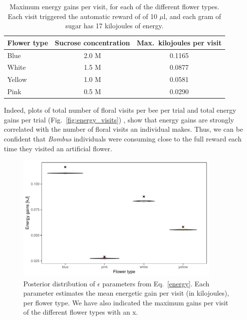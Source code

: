 \begin{refsection}
 \begin{table}[H]
 \centering
 \caption[Maximum energy gains per visit]{Maximum energy gains per visit, for each of the different flower types. Each visit triggered the automatic reward of of  10 $\mu$l, and each gram of sugar has 17 kilojoules of energy.}
 \label{tab:energy}
 \begin{tabular}{lcc}
 \toprule
 Flower type & Sucrose concentration & Max.\ kilojoules per visit \\ \midrule
 Blue        & 2.0 M                   & 0.1165                   \\
 White       & 1.5 M                 & 0.0877                   \\
 Yellow      & 1.0 M                   & 0.0581                   \\
 Pink        & 0.5 M                 & 0.0290                   \\ \bottomrule
 \end{tabular}
 \end{table}

 Indeed, plots of total number of floral visits per bee per trial and total energy gains per trial (Fig.~\ref{fig:energy_visits}) , show that energy gains are strongly correlated with the number of floral visits an individual makes. Thus, we can be confident that \textit{Bombus} individuals were consuming close to the full reward each time they visited an artificial flower.


 \begin{figure}[H]
     \centerline{\includegraphics[width=0.9\textwidth]{figures/appendixA_fig1.pdf}}
     \caption[Posterior distribution of $\epsilon$ parameters from Eq.~\ref{energy}]{ Posterior distribution of $\epsilon$ parameters from Eq.~\ref{energy}. Each parameter estimates the mean energetic gain per visit (in kilojoules), per flower type. We have also indicated the maximum gains per visit of the different flower types with an x.  }
     \label{fig:flower_type}
 \end{figure}{}



\end{refsection}
